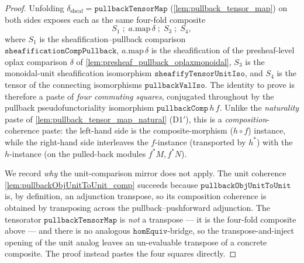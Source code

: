 \begin{proof}
  \leanok
  Unfolding \(\delta_{\mathrm{sheaf}} = \mathtt{pullbackTensorMap}\)
  (\cref{lem:pullback_tensor_map}) on both sides exposes each as the same four-fold
  composite
  \[
    S_1 \;\mathbin{;}\; a.\mathrm{map}\,\delta \;\mathbin{;}\; S_3 \;\mathbin{;}\; S_4,
  \]
  where \(S_1\) is the sheafification--pullback comparison
  \(\mathtt{sheafificationCompPullback}\), \(a.\mathrm{map}\,\delta\) is the
  sheafification of the presheaf-level oplax comparison \(\delta\) of
  \cref{lem:presheaf_pullback_oplaxmonoidal}, \(S_3\) is the monoidal-unit
  sheafification isomorphism \(\mathtt{sheafifyTensorUnitIso}\), and \(S_4\) is the
  tensor of the connecting isomorphisms \(\mathtt{pullbackValIso}\). The identity to
  prove is therefore a paste of \emph{four commuting squares}, conjugated throughout by
  the pullback pseudofunctoriality isomorphism \(\mathtt{pullbackComp}\,h\,f\). Unlike
  the \emph{naturality} paste of \cref{lem:pullback_tensor_map_natural} (D1$'$), this is
  a \emph{composition}-coherence paste: the left-hand side is the composite-morphism
  (\(h \circ f\)) instance, while the right-hand side interleaves the \(f\)-instance
  (transported by \(h^{*}\)) with the \(h\)-instance (on the pulled-back modules
  \(f^{*}M, f^{*}N\)).

  We record \emph{why} the unit-comparison mirror does not apply. The unit coherence
  \cref{lem:pullbackObjUnitToUnit_comp} succeeds because
  \(\mathtt{pullbackObjUnitToUnit}\) is, by definition, an adjunction transpose, so its
  composition coherence is obtained by transposing across the pullback--pushforward
  adjunction. The tensorator \(\mathtt{pullbackTensorMap}\) is \emph{not} a transpose ---
  it is the four-fold composite above --- and there is no analogous
  \(\mathtt{homEquiv}\)-bridge, so the transpose-and-inject opening of the unit analog
  leaves an un-evaluable transpose of a concrete composite. The proof instead
  pastes the four squares directly.


\end{proof}
